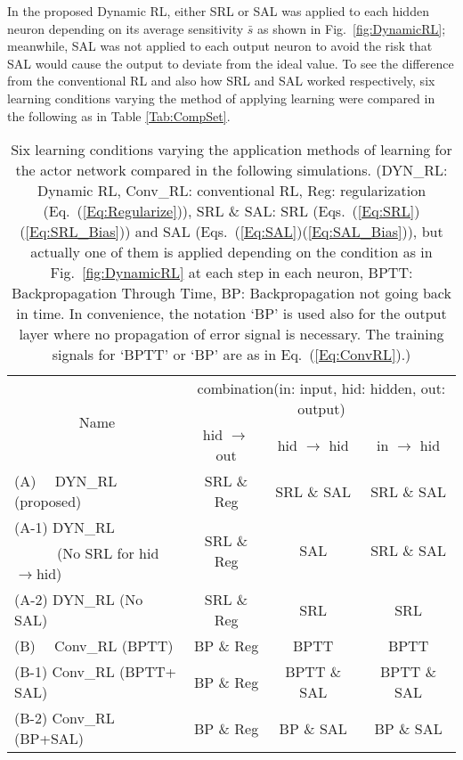 In the proposed Dynamic RL, either SRL or SAL
was applied to each hidden neuron depending on its average sensitivity $\bar{s}$ as shown in Fig.~\ref{fig:DynamicRL};
meanwhile, SAL was not applied to each output neuron to avoid the risk that SAL would cause the output to deviate from the ideal value.
To see the difference from the conventional RL and also how SRL and SAL worked respectively,
six learning conditions varying the method of applying learning were compared in the following
as in Table \ref{Tab:CompSet}.
\begin{table}[t]
  \label{Table:LearningCases}
  \begin{center}
    \vspace{0.5cm}
    \caption{Six learning conditions varying the application methods of learning for the actor network compared in the following simulations.
    (DYN\_RL: Dynamic RL, Conv\_RL: conventional RL, Reg: regularization (Eq.~(\ref{Eq:Regularize})),
     SRL \& SAL: SRL (Eqs.~(\ref{Eq:SRL})(\ref{Eq:SRL_Bias})) and SAL (Eqs.~(\ref{Eq:SAL})(\ref{Eq:SAL_Bias})), 
     but actually one of them is applied depending on the condition as in 
     Fig.~\ref{fig:DynamicRL} at each step in each neuron, BPTT: Backpropagation Through Time, 
     BP: Backpropagation not going back in time.
   In convenience, the notation `BP' is used also for the output layer
   where no propagation of error signal is necessary.
   The training signals for `BPTT' or `BP' are as in Eq.~(\ref{Eq:ConvRL}).)}
    \label{Tab:CompSet}
    \vspace{5mm}
    \small
      \begin{tabular}{l|ccc}
        \toprule
        \multicolumn{1}{c|}{\multirow{2}{*}{Name}}
        & \multicolumn{3}{c}{combination(in: input, hid: hidden, out: output)}\\ \cline{2-4}
             & hid $\to$ out & hid $\to$ hid & in $\to$ hid\\
         \midrule
         (A) \ \ DYN\_RL (proposed) & SRL \& Reg & SRL \& SAL & SRL \& SAL\\
         (A-1) DYN\_RL& \multirow{2}{*}{SRL \& Reg} & \multirow{2}{*}{SAL} & \multirow{2}{*}{SRL \& SAL}\\
          \ \ \ \ \ \ (No SRL for hid$\rightarrow$hid)\\
         (A-2) DYN\_RL (No SAL) & SRL \& Reg & SRL & SRL\\
         \midrule
         (B) \ \ Conv\_RL (BPTT) & BP \& Reg & BPTT & BPTT\\
         (B-1) Conv\_RL (BPTT+ SAL) & BP \& Reg & BPTT \& SAL & BPTT \& SAL\\
         (B-2) Conv\_RL (BP+SAL) & BP \& Reg & BP \& SAL & BP \& SAL\\ 
    \bottomrule
    \end{tabular}
    \label{Table:CompSet}
  \end{center}
\end{table}

